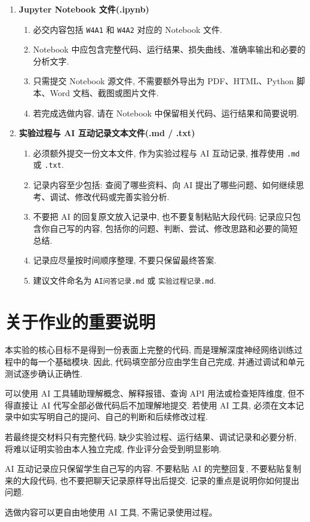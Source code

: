 \documentclass{../../nndlcourse}
\begin{document}
\begin{enumerate}
    \item \textbf{Jupyter Notebook 文件(.ipynb)}
    \begin{enumerate}
        \item 必交内容包括 \texttt{W4A1} 和 \texttt{W4A2} 对应的 Notebook 文件.
        \item Notebook 中应包含完整代码、运行结果、损失曲线、准确率输出和必要的分析文字.
        \item 只需提交 Notebook 源文件, 不需要额外导出为 PDF、HTML、Python 脚本、Word 文档、截图或图片文件.
        \item 若完成选做内容, 请在 Notebook 中保留相关代码、运行结果和简要说明.
    \end{enumerate}
    \item \textbf{实验过程与 AI 互动记录文本文件(.md / .txt)}
    \begin{enumerate}
        \item 必须额外提交一份文本文件, 作为实验过程与 AI 互动记录, 推荐使用 \texttt{.md} 或 \texttt{.txt}.
        \item 记录内容至少包括: 查阅了哪些资料、向 AI 提出了哪些问题、如何继续思考、调试、修改代码或完善实验分析.
        \item 不要把 AI 的回复原文放入记录中, 也不要复制粘贴大段代码; 记录应只包含你自己写的内容, 包括你的问题、判断、尝试、修改思路和必要的简短总结.
        \item 记录应尽量按时间顺序整理, 不要只保留最终答案.
        \item 建议文件命名为 \texttt{AI问答记录.md} 或 \texttt{实验过程记录.md}.
    \end{enumerate}
\end{enumerate}


\section{关于作业的重要说明}

本实验的核心目标不是得到一份表面上完整的代码, 而是理解深度神经网络训练过程中的每一个基础模块. 因此, 代码填空部分应由学生自己完成, 并通过调试和单元测试逐步确认正确性.

可以使用 AI 工具辅助理解概念、解释报错、查询 API 用法或检查矩阵维度, 但不得直接让 AI 代写全部必做代码后不加理解地提交. 若使用 AI 工具, 必须在文本记录中如实写明自己的提问、自己的判断和后续修改过程.

若最终提交材料只有完整代码, 缺少实验过程、运行结果、调试记录和必要分析, 将难以证明实验由本人独立完成, 作业评分会受到明显影响.

AI 互动记录应只保留学生自己写的内容. 不要粘贴 AI 的完整回复, 不要粘贴复制来的大段代码, 也不要把聊天记录原样导出后提交. 记录的重点是说明你如何提出问题.

选做内容可以更自由地使用 AI 工具, 不需记录使用过程。
\end{document}
